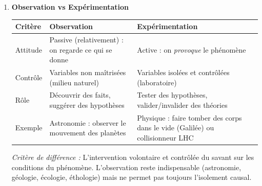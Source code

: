 \documentclass[11pt]{article}
\newcommand{\cle}[1]{{\popxbold\color{popdark}#1}}
\begin{document}
\begin{corrige}
\begin{enumerate}
\item \textbf{Observation vs Expérimentation}
\begin{center}
\begin{tabularx}{\linewidth}{|l|X|X|}\hline
\rowcolor{popblueL} \textbf{Critère} & \textbf{Observation} & \textbf{Expérimentation} \\ \hline
Attitude & \cle{Passive} (relativement) : on regarde ce qui se donne & \cle{Active} : on \emph{provoque} le phénomène \\ \hline
Contrôle & Variables non maîtrisées (milieu naturel) & Variables \cle{isolées} et \cle{contrôlées} (laboratoire) \\ \hline
Rôle & Découvrir des faits, suggérer des hypothèses & \cle{Tester} des hypothèses, valider/invalider des théories \\ \hline
Exemple & Astronomie : observer le mouvement des planètes & Physique : faire tomber des corps dans le vide (Galilée) ou collisionneur LHC \\ \hline
\end{tabularx}
\end{center}
\emph{Critère de différence :} L'\cle{intervention volontaire et contrôlée} du savant sur les conditions du phénomène. L'observation reste indispensable (astronomie, géologie, écologie, éthologie) mais ne permet pas toujours l'isolement causal.
\end{enumerate}
\end{corrige}
\end{document}
